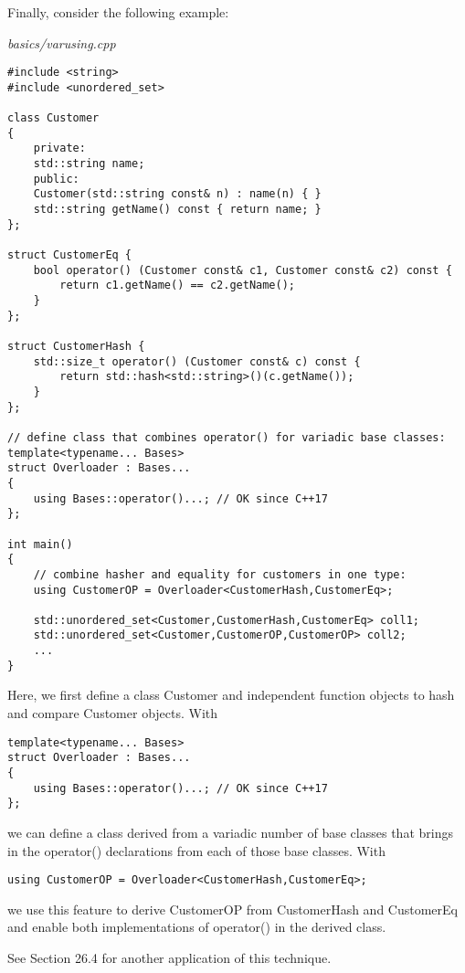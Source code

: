 
Finally, consider the following example:

\noindent
\textit{basics/varusing.cpp}
\begin{lstlisting}[style=styleCXX]
#include <string>
#include <unordered_set>

class Customer
{
	private:
	std::string name;
	public:
	Customer(std::string const& n) : name(n) { }
	std::string getName() const { return name; }
};

struct CustomerEq {
	bool operator() (Customer const& c1, Customer const& c2) const {
		return c1.getName() == c2.getName();
	}
};

struct CustomerHash {
	std::size_t operator() (Customer const& c) const {
		return std::hash<std::string>()(c.getName());
	}
};

// define class that combines operator() for variadic base classes:
template<typename... Bases>
struct Overloader : Bases...
{
	using Bases::operator()...; // OK since C++17
};

int main()
{
	// combine hasher and equality for customers in one type:
	using CustomerOP = Overloader<CustomerHash,CustomerEq>;
	
	std::unordered_set<Customer,CustomerHash,CustomerEq> coll1;
	std::unordered_set<Customer,CustomerOP,CustomerOP> coll2;
	...
}
\end{lstlisting}

Here, we first define a class Customer and independent function objects to hash and compare Customer objects. With

\begin{lstlisting}[style=styleCXX]
template<typename... Bases>
struct Overloader : Bases...
{
	using Bases::operator()...; // OK since C++17
};
\end{lstlisting}

we can define a class derived from a variadic number of base classes that brings in the operator() declarations from each of those base classes. With

\begin{lstlisting}[style=styleCXX]
using CustomerOP = Overloader<CustomerHash,CustomerEq>;
\end{lstlisting}

we use this feature to derive CustomerOP from CustomerHash and CustomerEq and enable both implementations of operator() in the derived class.

See Section 26.4 for another application of this technique.


























